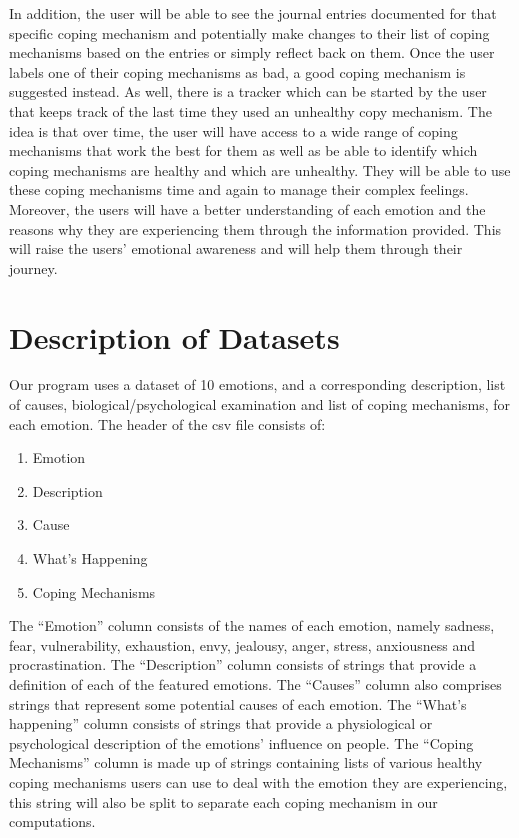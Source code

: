 \documentclass{article}
\begin{document}
    In addition, the user will be able to see the journal entries documented for that specific coping mechanism and potentially make changes to their list of coping mechanisms based on the entries or simply reflect back on them. Once the user labels one of their coping mechanisms as bad, a good coping mechanism is suggested instead. As well, there is a tracker which can be started by the user that keeps track of the last time they used an unhealthy copy mechanism. The idea is that over time, the user will have access to a wide range of coping mechanisms that work the best for them as well as be able to identify which coping mechanisms are healthy and which are unhealthy. They will be able to use these coping mechanisms time and again to manage their complex feelings. Moreover, the users will have a better understanding of each emotion and the reasons why they are experiencing them through the information provided. This will raise the users’ emotional awareness and will help them through their journey.


    \section{Description of Datasets}

    Our program uses a dataset of 10 emotions, and a corresponding description, list of causes, biological/psychological examination and list of coping mechanisms, for each emotion. The header of the csv file consists of:
    \begin{enumerate}
        \item Emotion
        \item Description
        \item Cause
        \item What’s Happening
        \item Coping Mechanisms\\
    \end{enumerate}


    The “Emotion” column consists of the names of each emotion, namely sadness, fear, vulnerability, exhaustion, envy, jealousy, anger, stress, anxiousness and procrastination. The “Description” column consists of strings that provide a definition of each of the featured emotions. The “Causes” column also comprises strings that represent some potential causes of each emotion. The “What’s happening” column consists of strings that provide a physiological or psychological description of the emotions' influence on people. The “Coping Mechanisms” column is made up of strings containing lists of various healthy coping mechanisms users can use to deal with the emotion they are experiencing, this string will also be split to separate each coping mechanism in our computations.\\
\end{document}
